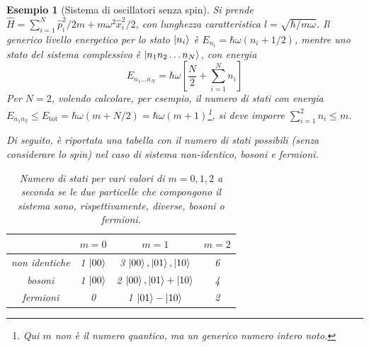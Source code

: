 \documentclass[11pt, a4paper]{scrartcl} %
\numberwithin{equation}{subsection}
\theoremstyle{style2}
\theoremstyle{style1}
\newtheorem{esempio}{Esempio}[section]
\begin{document}
\begin{esempio}
	[Sistema di oscillatori senza spin]
	Si prende $\hat{H}=\sum_{i=1}^{N} \hat{p}^2_i / 2m + m\omega^2 \hat{x}^2_i / 2$, con lunghezza caratteristica $l = \sqrt{\hbar / m\omega} $.
	Il generico livello energetico per lo stato $\ket{n_i} $ \`e $E_{n_i} = \hbar  \omega ( n_i + 1 / 2)$, mentre uno stato del sistema complessivo \`e $\ket{n_1 n_2 \ldots n_N} $, con energia
	\[
	E_{n_1 \ldots n_N} = \hbar \omega \left[ \frac{N}{2} + \sum_{i=1}^{N} n_i \right] 
	\] 
	Per $N=2$, volendo calcolare, per esempio, il numero di stati con energia $E_{n_1 n_2} \le E_\text{tot} = \hbar \omega (m + N / 2) = \hbar \omega (m + 1)$\footnote{Qui $m$ non \`e il numero quantico, ma un generico numero intero noto.}, si deve imporre $\sum_{i=1}^{2} n_i \le m$.

	Di seguito, \`e riportata una tabella con il numero di stati possibili (senza considerare lo spin) nel caso di sistema non-identico, bosoni e fermioni.
	\begin{table}[h!]
		\centering
		\begin{tabular}{c | c | c | c}
		 & $m=0$ & $m=1$ & $m=2$\\
		\hline
			non identiche &1 $\ket{00} $&3 $\ket{00} , \ket{01} , \ket{10} $& 6\\
			bosoni&1 $\ket{00} $ &2 $\ket{00} , \ket{01} +\ket{10} $ &4\\
			fermioni &0 &1 $\ket{01} - \ket{10} $&2\\
		\hline
		\end{tabular}
		\caption{Numero di stati per vari valori di $m=0,1,2$ a seconda se le due particelle che compongono il sistema sono, rispettivamente, diverse, bosoni o fermioni.}
	\end{table}
\end{esempio}
\end{document}
